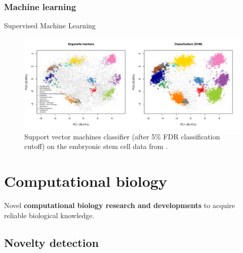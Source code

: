 \subsubsection*{Machine learning}
\label{sec:ml}

\begin{frame}{Supervised Machine Learning}
  \begin{figure}[h]
    \centering
    \includegraphics[width=\linewidth]{figs_all/hyperlopit-class.pdf}
    \caption{Support vector machines classifier (after 5\% FDR
      classification cutoff) on the embryonic stem cell data from
      \cite{Christoforou:2016}.}
  \end{figure}
\end{frame}

\section{Computational biology}

\begin{frame}{}
  \begin{center}
    \Large{Novel \textbf{computational biology research and developments}
    to acquire reliable biological knowledge.}
  \end{center}
\end{frame}

\subsection{Novelty detection}

